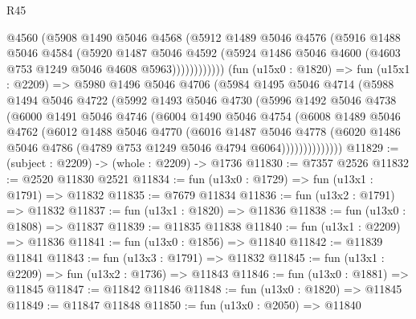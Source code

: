 \begin{lexlean}{R45}
\begin{coremodule}
                    @4560
                    (@5908
                      @1490
                      @5046
                      @4568
                      (@5912
                        @1489
                        @5046
                        @4576
                        (@5916
                          @1488
                          @5046
                          @4584
                          (@5920
                            @1487
                            @5046
                            @4592
                            (@5924 @1486 @5046 @4600 (@4603 @753 @1249 @5046 @4608 @5963))))))))))))
        (fun (u15x0 : @1820) =>
        fun (u15x1 : @2209) =>
        @5980
          @1496
          @5046
          @4706
          (@5984
            @1495
            @5046
            @4714
            (@5988
              @1494
              @5046
              @4722
              (@5992
                @1493
                @5046
                @4730
                (@5996
                  @1492
                  @5046
                  @4738
                  (@6000
                    @1491
                    @5046
                    @4746
                    (@6004
                      @1490
                      @5046
                      @4754
                      (@6008
                        @1489
                        @5046
                        @4762
                        (@6012
                          @1488
                          @5046
                          @4770
                          (@6016
                            @1487
                            @5046
                            @4778
                            (@6020
                              @1486
                              @5046
                              @4786
                              (@4789 @753 @1249 @5046 @4794 @6064))))))))))))))
@11829 := (subject : @2209) -> (whole : @2209) -> @1736
@11830 := @7357 @2526
@11832 := @2520 @11830 @2521
@11834 := fun (u13x0 : @1729) => fun (u13x1 : @1791) => @11832
@11835 := @7679 @11834
@11836 := fun (u13x2 : @1791) => @11832
@11837 := fun (u13x1 : @1820) => @11836
@11838 := fun (u13x0 : @1808) => @11837
@11839 := @11835 @11838
@11840 := fun (u13x1 : @2209) => @11836
@11841 := fun (u13x0 : @1856) => @11840
@11842 := @11839 @11841
@11843 := fun (u13x3 : @1791) => @11832
@11845 := fun (u13x1 : @2209) => fun (u13x2 : @1736) => @11843
@11846 := fun (u13x0 : @1881) => @11845
@11847 := @11842 @11846
@11848 := fun (u13x0 : @1820) => @11845
@11849 := @11847 @11848
@11850 := fun (u13x0 : @2050) => @11840

\end{coremodule}
\end{lexlean}
